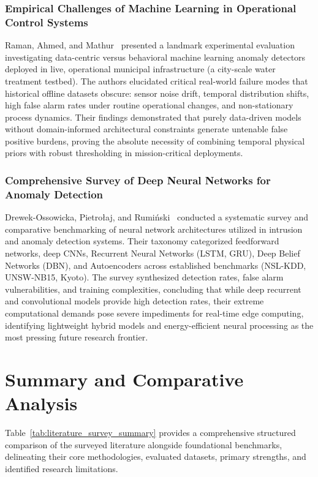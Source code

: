 \documentclass[12pt,a4paper]{report}
\begin{document}
\subsubsection{Empirical Challenges of Machine Learning in Operational Control Systems}
Raman, Ahmed, and Mathur~\cite{ref_raman2021_ics} presented a landmark experimental evaluation investigating data-centric versus behavioral machine learning anomaly detectors deployed in live, operational municipal infrastructure (a city-scale water treatment testbed). The authors elucidated critical real-world failure modes that historical offline datasets obscure: sensor noise drift, temporal distribution shifts, high false alarm rates under routine operational changes, and non-stationary process dynamics. Their findings demonstrated that purely data-driven models without domain-informed architectural constraints generate untenable false positive burdens, proving the absolute necessity of combining temporal physical priors with robust thresholding in mission-critical deployments.

\subsubsection{Comprehensive Survey of Deep Neural Networks for Anomaly Detection}
Drewek-Ossowicka, Pietro{\l}aj, and Rumi{\'n}ski~\cite{ref_drewek2021_survey} conducted a systematic survey and comparative benchmarking of neural network architectures utilized in intrusion and anomaly detection systems. Their taxonomy categorized feedforward networks, deep CNNs, Recurrent Neural Networks (LSTM, GRU), Deep Belief Networks (DBN), and Autoencoders across established benchmarks (NSL-KDD, UNSW-NB15, Kyoto). The survey synthesized detection rates, false alarm vulnerabilities, and training complexities, concluding that while deep recurrent and convolutional models provide high detection rates, their extreme computational demands pose severe impediments for real-time edge computing, identifying lightweight hybrid models and energy-efficient neural processing as the most pressing future research frontier.

\section{Summary and Comparative Analysis}
Table~\ref{tab:literature_survey_summary} provides a comprehensive structured comparison of the surveyed literature alongside foundational benchmarks, delineating their core methodologies, evaluated datasets, primary strengths, and identified research limitations.
\end{document}
